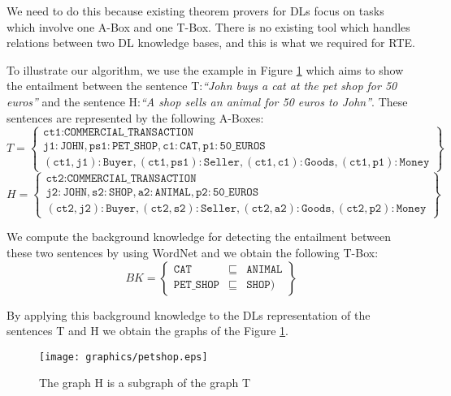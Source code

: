 \documentclass{esslli}
\newcommand{\dl}[1]{\texttt{#1}}
\newcommand{\dd}{{:}}
\begin{document}
We need to do this because existing theorem provers for DLs focus on
tasks which involve one A-Box and one T-Box. There is no existing
tool which handles relations between two DL knowledge bases, and this
is what we required for RTE.

To illustrate our algorithm, we use the example in Figure
\ref{petshop} which aims to show the entailment between the sentence
T:\emph{``John buys a cat at the pet shop for 50 euros''} and the
sentence H:\emph{``A shop sells an animal for 50 euros to
  John''}. These sentences are represented by the following A-Boxes:
$$
T = \left\{
\begin{array}{c}
\dl{ct1} \dd \dl{COMMERCIAL\_TRANSACTION} \\
\dl{j1} \dd \dl{JOHN}, \dl{ps1} \dd \dl{PET\_SHOP}, \dl{c1} \dd \dl{CAT}, \dl{p1} \dd \dl{50\_EUROS} \\
(\dl{ct1},\dl{j1}) \dd \dl{Buyer}, (\dl{ct1},\dl{ps1}) \dd \dl{Seller}, (\dl{ct1},\dl{c1}) \dd \dl{Goods}, (\dl{ct1},\dl{p1}) \dd \dl{Money}
\end{array}
\right\}$$
$$H = \left\{
\begin{array}{c}
\dl{ct2} \dd \dl{COMMERCIAL\_TRANSACTION} \\
\dl{j2} \dd \dl{JOHN}, \dl{s2} \dd \dl{SHOP}, \dl{a2} \dd \dl{ANIMAL}, \dl{p2} \dd \dl{50\_EUROS} \\
(\dl{ct2},\dl{j2}) \dd \dl{Buyer}, (\dl{ct2},\dl{s2}) \dd \dl{Seller}, (\dl{ct2},\dl{a2}) \dd \dl{Goods}, (\dl{ct2},\dl{p2}) \dd \dl{Money}
\end{array}
\right\}$$

\noindent
We compute the background knowledge for detecting the entailment
between these two sentences by using WordNet and we obtain the
following T-Box:
$$
BK = \left\{
\begin{array}{rcl}
 \dl{CAT} &\sqsubseteq& \dl{ANIMAL}\\
 \dl{PET\_SHOP} &\sqsubseteq& \dl{SHOP})
\end{array}
\right\}$$

\noindent
By applying this background knowledge to the DLs representation of the
sentences T and H we obtain the graphs of the Figure \ref{petshop}.

\begin{figure}
   \texttt{[image: graphics/petshop.eps]}
   \caption{The graph H is a subgraph of the graph T \label{petshop}}
\end{figure}
\end{document}
